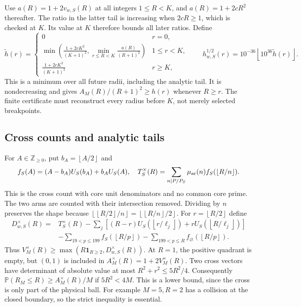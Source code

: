 \documentclass[11pt]{article}
\theoremstyle{definition}\newtheorem{definition}[theorem]{Definition}
\theoremstyle{remark}\newtheorem{remark}[theorem]{Remark}
\newcommand{\Prb}{\mathbb P}
\newcommand{\Z}{\mathbb Z}
\newcommand{\unit}{\mathbf1}
\newcommand{\floor}[1]{\left\lfloor #1\right\rfloor}
\begin{document}
Use \(a(R)=1+2v_{w,S}(R)\) at all integers \(1\le R<K\),
and \(a(R)=1+2cR^2\) thereafter.
The ratio in the latter tail is increasing when \(2cR\ge1\), which is checked
at \(K\). Its value at \(K\) therefore bounds all later ratios.
Define
\[
 \widetilde h(r)=
 \begin{cases}
 0&r=0,\\
 \min\left(\frac{1+2cK^2}{(K+1)^2},
           \min_{r\le R<K}\frac{a(R)}{(R+1)^2}\right)&1\le r<K,\\
 \frac{1+2cK^2}{(K+1)^2}&r\ge K,
 \end{cases}
 \qquad h^{1/2}_{w,S}(r)=10^{-36}\floor{10^{36}\widetilde h(r)}.        \tag{A7}
\]
This is a minimum over all future radii, including the analytic tail.
It is nondecreasing and gives \(A_M(R)/(R+1)^2\ge h(r)\) whenever
\(R\ge r\). The finite certificate must reconstruct every radius
before \(K\), not merely selected breakpoints.

\subsection{Cross counts and analytic tails}
For \(A\in\Z_{\ge0}\), put \(b_A=\floor{A/2}\) and
\[
 f_S(A)=(A-b_A)U_S(b_A)+b_AU_S(A),\quad
 T^\times_S(R)=\sum_{n\mid P/P_S}\mu_{\rm ar}(n)f_S(\floor{R/n}).
\]
This is the cross count with core unit denominators and no common core
prime. The two arms are counted with their intersection removed.
Dividing by \(n\) preserves the shape because
\(\floor{\floor{R/2}/n}=\floor{\floor{R/n}/2}\).
For \(r=\floor{R/2}\) define
\[
\begin{split}
 D^\times_{w,S}(R)={}&T^\times_S(R)
 -\sum_j[(R-r)U_S(\floor{r/\ell_j})+rU_S(\floor{R/\ell_j})]\\
 &-\sum_{19<p\le199}f_S(\floor{R/p})
 -\sum_{199<p\le R}f_\varnothing(\floor{R/p}).
\end{split}                                                        \tag{A8}
\]
Thus \(V^\times_M(R)\ge
\max(R\unit_{R\ge2},D^\times_{w,S}(R))\).
At \(R=1\), the positive quadrant is empty, but \((0,1)\) is included
in \(A^\times_M(R)=1+2V^\times_M(R)\).
Two cross vectors have determinant of absolute value at most
\(R^2+r^2\le5R^2/4\). Consequently
\(\Prb(R_M\le R)\ge A^\times_M(R)/M\) if \(5R^2<4M\).
This is a lower bound, since the cross is only part of the physical ball.
For example \(M=5,R=2\) has a collision at the closed boundary, so
the strict inequality is essential.
\end{document}

